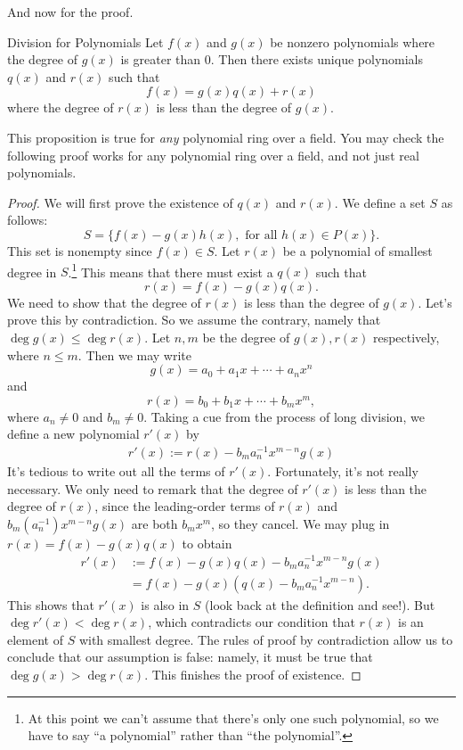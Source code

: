 And now for the proof.

\begin {prop} {Division for Polynomials}
Let $f(x)$ and $g(x)$ be nonzero polynomials where the degree of $g(x)$ is greater than 0.  Then there exists unique polynomials $q(x)$ and $r(x)$ such that 
\[
f(x) = g(x)q(x) + r(x)
\]
where the degree of $r(x)$ is less than the degree of $g(x)$.
\end {prop}

\begin {rem}
This proposition is true for \emph{any} polynomial ring over a field. You may check the following proof works for any polynomial ring over a field, and not just real polynomials.
\end{rem}


\begin{proof}
We will first prove the existence of $q(x)$ and $r(x)$. We define a set $S$ as follows: 
\[S = \{f(x) - g(x) h(x), \text{ for all } h(x) \in P(x) \}.\] 
 This set is nonempty since $f(x) \in
S$. 
Let
$r(x)$ be  a polynomial of smallest degree in $S$.\footnote{At this point we can't assume that there's only one such polynomial, so we have to say ``a polynomial'' rather than ``the polynomial''.} This means that there must exist a $q(x)$ such that  
\[
r(x) = f(x) - g(x) q(x).
\]
We need to show that the degree of $r(x)$ is less than the degree of
$g(x)$. Let's prove this by contradiction. So we assume the contrary, namely  that $\deg g(x) \leq \deg r(x)$. 
Let $n,m$ be the degree of $g(x),r(x)$ respectively, where $n \leq m$. Then we may write
\[
g(x) = a_0 + a_1 x + \cdots + a_n x^n
\]
and
\[
r(x) = b_0 + b_1 
x + \cdots + b_m x^m, \]
where $a_n \neq 0$ and $b_m \neq 0$. 
Taking a cue from the process of long division, we define a new polynomial $r'(x)$ by
\begin{align*}
r'(x) := r(x) - b_m a_n^{-1} x^{m-n}g(x)
\end{align*}
It's tedious to write out all the terms of $r'(x)$. Fortunately, it's not really necessary. We only need to remark that the degree of $r'(x)$ is less than the degree of $r(x)$, since the leading-order terms of $r(x)$ and $b_m(a_n^{-1}) x^{m-n}g(x)$ are both $b_m x^m$, so they cancel. We may plug in $r(x) = f(x) - g(x) q(x)$ to obtain
\begin{align*}
r'(x) &:=  f(x) - g(x) q(x) - b_m a_n^{-1}  x^{m-n}g(x)\\
&= f(x) - g(x) \left( q(x) - b_m a_n^{-1}  x^{m-n}\right).
\end{align*}
This shows that $r'(x)$ is also in $S$  (look back at the definition and see!).  But 
$\deg r'(x) < \deg r(x)$, which contradicts our condition that $r(x)$ is an element of $S$ with smallest degree. The rules of proof by contradiction allow us to conclude that our assumption is false: namely, it must be true that $\deg g(x) > \deg r(x)$.
This finishes the proof of existence.


\end{proof}
